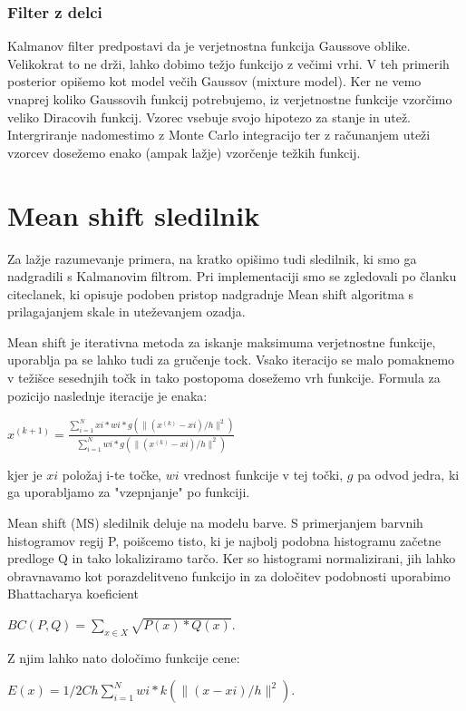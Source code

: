 \documentclass[a4paper]{article}
\begin{document}
\subsubsection{Filter z delci}
Kalmanov filter predpostavi da je verjetnostna funkcija Gaussove oblike. Velikokrat to ne drži, lahko dobimo težjo funkcijo z večimi vrhi. V teh primerih posterior opišemo kot model večih Gaussov (mixture model). Ker ne vemo vnaprej koliko Gaussovih funkcij potrebujemo, iz verjetnostne funkcije vzorčimo veliko Diracovih funkcij. Vzorec vsebuje svojo hipotezo za stanje in utež. Intergriranje nadomestimo z Monte Carlo integracijo ter z računanjem uteži vzorcev dosežemo enako (ampak lažje) vzorčenje težkih funkcij. 

\section{Mean shift sledilnik}
Za lažje razumevanje primera, na kratko opišimo tudi sledilnik, ki smo ga nadgradili s Kalmanovim filtrom. Pri implementaciji smo se zgledovali po članku cite{clanek}, ki opisuje podoben pristop nadgradnje Mean shift algoritma s prilagajanjem skale in uteževanjem ozadja.

Mean shift je iterativna metoda za iskanje maksimuma verjetnostne funkcije, uporablja pa se lahko tudi za gručenje tock. Vsako iteracijo se malo pomaknemo v težišce sesednjih točk in tako postopoma dosežemo vrh funkcije. Formula za pozicijo naslednje iteracije je enaka:

$x^{(k+1)}= \frac{\displaystyle\sum\limits_{i=1}^N xi*wi*g(\parallel(x^{(k)}-xi)/h\parallel^2)}{\displaystyle\sum\limits_{i=1}^Nwi*g(\parallel(x^{(k)}-xi)/h\parallel^2)}$

kjer je $xi$ položaj i-te točke, $wi$ vrednost funkcije v tej točki, $g$ pa odvod jedra, ki ga uporabljamo za "vzepnjanje" po funkciji.

Mean shift (MS) sledilnik deluje na modelu barve. S primerjanjem barvnih histogramov regij P, poišcemo tisto, ki je najbolj podobna histogramu začetne predloge Q in tako lokaliziramo tarčo. Ker so histogrami normalizirani, jih lahko obravnavamo kot porazdelitveno funkcijo in za določitev podobnosti uporabimo Bhattacharya koeficient 

$BC(P, Q) =\sum\limits_{x\in X} \sqrt{P(x)*Q(x)}$. 

Z njim lahko nato določimo funkcije cene: 

$E(x) = 1/2Ch\displaystyle\sum\limits_{i=1}^N wi*k(\parallel(x-xi)/h\parallel^2)$. 
\end{document}
